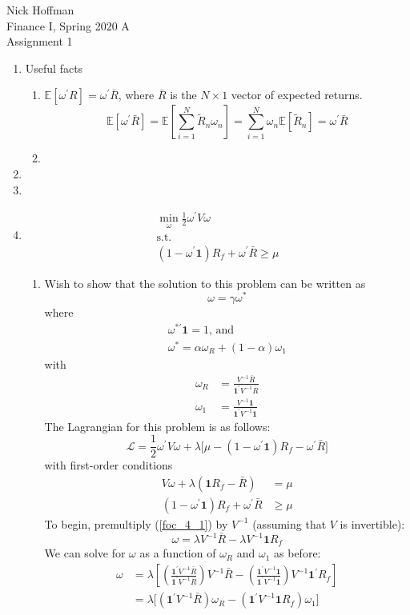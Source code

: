 \documentclass[11pt]{article}
\newcommand{\w}{\omega}
\newcommand{\p}{\prime}
\newcommand{\one}{\mathbf{1}}
\newcommand{\lagr}{\mathcal{L}}
\newcommand{\inv}[1]{#1^{-1}}
\newcommand{\ev}{\mathbb{E}}
\begin{document}
	
\begin{flushleft}
	Nick Hoffman \\
	Finance I, Spring 2020 A \\
	Assignment 1 \\
\end{flushleft}

\begin{enumerate}
	\item Useful facts
	\begin{enumerate}
		\item $ \ev[\w ^\p R ] = \w^\p \bar{R} $, where $\bar{R}$ is the $ N\times 1 $ vector of expected returns.
		\[\ev[\w^\p \bar{R}] = \ev\left[\sum_{i = 1}^{N}\tilde{R}_n \w_n\right] = \sum_{i = 1}^N \w_n \ev[\tilde{R}_n] = \w^\p \bar{R} \]
		
		\item 
	\end{enumerate}
	\item 
	\item 
	\item 
	\begin{gather*}
	\min_\w \frac{1}{2}\w^\p V \w \\
	\text{s.t.} \\
	(1 - \w^\p \one)R_f + \w^\p \bar{R} \geq \mu
	\end{gather*}
	\begin{enumerate}
		\item Wish to show that the solution to this problem can be written as 
		\[\w = \gamma \w^*\]
		where 
		\begin{gather*}
			\w^{*\p}\one = 1\text{, and} \\
			\w^* = \alpha \w_R + (1 - \alpha)\w_1
		\end{gather*}
		with 
		\begin{align*}
		\w_R &= \frac{\inv{V}\bar{R}}{\one^\p \inv{V} \bar{R}} \\
		\w_1 &= \frac{\inv{V} \one}{\one^\p \inv{V} \one}
		\end{align*}
		The Lagrangian for this problem is as follows:
		\[\lagr = \frac{1}{2}\w^\p V \w + \lambda \big[\mu - (1 - \w^\p \one)R_f - \w^\p \bar{R}\big] \]
		with first-order conditions
		\begin{align}
		V\w + \lambda(\one R_f - \bar{R}) &= \mu \label{foc_4_1}\\
		(1 - \w^\p \one)R_f + \w^\p \bar{R} &\geq \mu \label{foc_4_2}
		\end{align}
		To begin, premultiply (\ref{foc_4_1}) by $ \inv{V} $ (assuming that $ V $ is invertible):
		\[\w = \lambda \inv{V} \bar{R} - \lambda \inv{V} \one R_f\]
		We can solve for $ \w $ as a function of $ \w_R $ and $ \w_1 $ as before:
		\begin{align*}
		\w &= \lambda \left[\left(\frac{\one^\p \inv{V} \bar{R}}{\one^\p \inv{V} \bar{R}}\right)\inv{V}\bar{R} - \left(\frac{\one^\p \inv{V} \one}{\one^\p \inv{V} \one}\right)\inv{V}\one^\p R_f\right] \\
		&= \lambda \big[(\one^\p \inv{V}\bar{R})\w_R - (\one^\p \inv{V}\one R_f)\w_1\big]
		\end{align*}
		
	\end{enumerate}
\end{enumerate}
\end{document}

